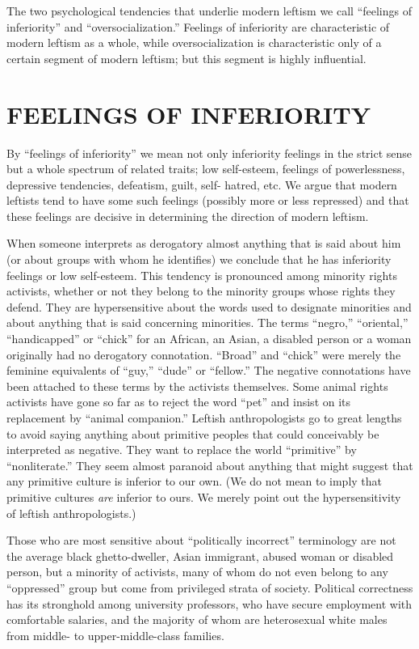  The two psychological tendencies that underlie modern leftism we call “feelings of inferiority” and “oversocialization.” Feelings of inferiority are characteristic of modern leftism as a whole, while oversocialization is characteristic only of a certain segment of modern leftism; but this segment is highly influential.

\chapter{FEELINGS OF INFERIORITY}

 By “feelings of inferiority” we mean not only inferiority feelings in the strict sense but a whole spectrum of related traits; low self-esteem, feelings of powerlessness, depressive tendencies, defeatism, guilt, self- hatred, etc. We argue that modern leftists tend to have some such feelings (possibly more or less repressed) and that these feelings are decisive in determining the direction of modern leftism.

 When someone interprets as derogatory almost anything that is said about him (or about groups with whom he identifies) we conclude that he has inferiority feelings or low self-esteem. This tendency is pronounced among minority rights activists, whether or not they belong to the minority groups whose rights they defend. They are hypersensitive about the words used to designate minorities and about anything that is said concerning minorities. The terms “negro,” “oriental,” “handicapped” or “chick” for an African, an Asian, a disabled person or a woman originally had no derogatory connotation. “Broad” and “chick” were merely the feminine equivalents of “guy,” “dude” or “fellow.” The negative connotations have been attached to these terms by the activists themselves. Some animal rights activists have gone so far as to reject the word “pet” and insist on its replacement by “animal companion.” Leftish anthropologists go to great lengths to avoid saying anything about primitive peoples that could conceivably be interpreted as negative. They want to replace the world “primitive” by “nonliterate.” They seem almost paranoid about anything that might suggest that any primitive culture is inferior to our own. (We do not mean to imply that primitive cultures {\em are} inferior to ours. We merely point out the hypersensitivity of leftish anthropologists.)

 Those who are most sensitive about “politically incorrect” terminology are not the average black ghetto-dweller, Asian immigrant, abused woman or disabled person, but a minority of activists, many of whom do not even belong to any “oppressed” group but come from privileged strata of society. Political correctness has its stronghold among university professors, who have secure employment with comfortable salaries, and the majority of whom are heterosexual white males from middle- to upper-middle-class families.

